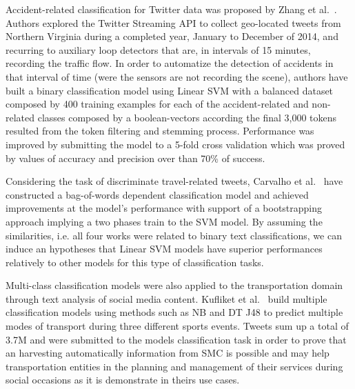 Accident-related classification for Twitter data was proposed by Zhang et al.~\cite{zhang2016mining}. Authors explored the Twitter Streaming API to collect geo-located tweets from Northern Virginia during a completed year, January to December of 2014, and recurring to auxiliary loop detectors that are, in intervals of 15 minutes, recording the traffic flow. In order to automatize the detection of accidents in that interval of time (were the sensors are not recording the scene), authors have built a binary classification model using Linear \gls{SVM} with a balanced dataset composed by 400 training examples for each of the accident-related and non-related classes composed by a boolean-vectors according the final 3,000 tokens resulted from the token filtering and stemming process. Performance was improved by submitting the model to a 5-fold cross validation which was proved by values of accuracy and precision over than 70\% of success.


Considering the task of discriminate travel-related tweets, Carvalho et al.~\cite{carvalho2010real, Kokkinogenis2015219} have constructed a bag-of-words dependent classification model and achieved improvements at the model's performance with support of a bootstrapping approach implying a two phases train to the \gls{SVM} model.  By assuming the similarities, i.e. all four works were related to binary text classifications, we can induce an hypotheses that Linear \gls{SVM} models have superior performances relatively to other models for this type of classification tasks.

Multi-class classification models were also applied to the transportation domain through text analysis of social media content. Kufliket et al.~\cite{kuflik2017automating} build multiple classification models using methods such as \gls{NB} and \gls{DT J48} to predict multiple modes of transport during three different sports events. Tweets sum up a total of 3.7M and were submitted to the models classification task in order to prove that an harvesting automatically information from \gls{SMC} is possible and may help transportation entities in the planning and management of their services during social occasions as it is demonstrate in theirs use cases.

